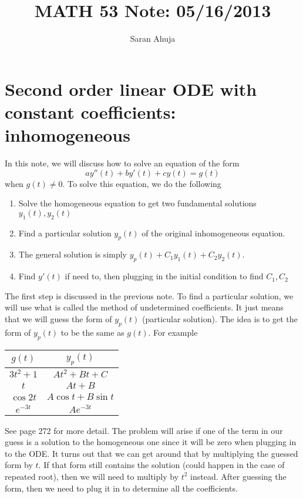 \documentclass[10pt]{amsart}
\title{MATH 53 Note: 05/16/2013}
\author{Saran Ahuja}
\begin{document}
\maketitle

\section{Second order linear ODE with constant coefficients: inhomogeneous}
In this note, we will discuss how to solve an equation of the form
$$ ay''(t)+by'(t)+cy(t) = g(t) $$
when $g(t) \neq 0$. To solve this equation, we do the following
\begin{enumerate}
	\item Solve the homogeneous equation to get two fundamental solutions $y_{1}(t),y_{2}(t)$
	\item Find a particular solution $y_{p}(t)$ of the original inhomogeneous equation.
	\item The general solution is simply $y_{p}(t)+C_{1}y_{1}(t)+C_{2}y_{2}(t)$.
	\item Find $y'(t)$ if need to, then plugging in the initial condition to find $C_{1},C_{2}$
\end{enumerate} 

The first step is discussed in the previous note. To find a particular solution, we will use what is called the method of undetermined coefficients. It just means that we will guess the form of $y_{p}(t)$ (particular solution). The idea is to get the form of $y_{p}(t)$ to be the same as $g(t)$. For example

\begin{center}
\begin{tabular}{c | c}
	 $g(t)$  &$y_{p}(t)$  \\
	 \hline 
	 $3t^{2}+1$	&$At^{2}+Bt+C$  \\
	 $t $			&$At+B$ \\
	$\cos 2t$		&$A\cos t + B\sin t$ \\
	$ e^{-3t}$		&$Ae^{-3t}$
\end{tabular}
\end{center}

See page 272 for more detail. The problem will arise if one of the term in our guess is a solution to the homogeneous one since it will be zero when plugging in to the ODE. It turns out that we can get around that by multiplying the guessed form by $t$. If that form still contains the solution (could happen in the case of repeated root), then we will need to multiply by $t^{2}$ instead. After guessing the form, then we need to plug it in to determine all the coefficients.
\end{document}
